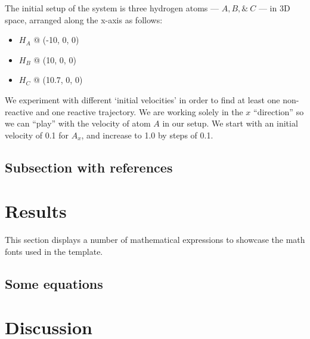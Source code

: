 \documentclass[letterpaper,11pt,leqno]{article}
\begin{document}
The initial setup of the system is three hydrogen atoms --- $A, B, \&\ C$ --- in 3D space,
arranged along the x-axis as follows:
\begin{itemize}
  \item $H_A$ @ (-10, 0, 0)
  \item $H_B$ @ (10, 0, 0)
  \item $H_C$ @ (10.7, 0, 0)
\end{itemize}
We experiment with different `initial velocities' in order to find at least one non-reactive
and one reactive trajectory.  We are working solely in the $x$ ``direction'' so we can ``play''
with the velocity of atom $A$ in our setup.  We start with an initial velocity of 0.1 for
$A_x$, and increase to 1.0 by steps of 0.1.

\subsection{Subsection with references} 



\section{Results}\label{s:results}

This section displays a number of mathematical expressions to showcase the math fonts used in the template.

\subsection{Some equations} 

\section{Discussion}\label{s:discussion}
\end{document}
